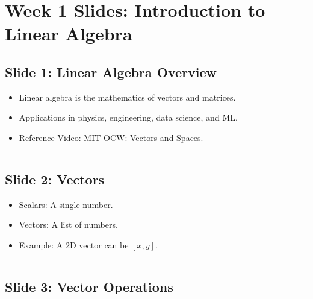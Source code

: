 \documentclass[
]{article}
\author{}
\date{}
\providecommand{\tightlist}{%
  \setlength{\itemsep}{0pt}\setlength{\parskip}{0pt}}
\begin{document}
\hypertarget{week-1-slides-introduction-to-linear-algebra}{%
	\section{Week 1 Slides: Introduction to Linear
	  Algebra}\label{week-1-slides-introduction-to-linear-algebra}}

\hypertarget{slide-1-linear-algebra-overview}{%
	\subsection{Slide 1: Linear Algebra
		Overview}\label{slide-1-linear-algebra-overview}}

\begin{itemize}
	\tightlist
	\item
	      Linear algebra is the mathematics of vectors and matrices.
	\item
	      Applications in physics, engineering, data science, and ML.
	\item
	      Reference Video:
	      \href{https://www.youtube.com/watch?v=ZK3O402wf1c}{MIT OCW: Vectors
		      and Spaces}.
\end{itemize}

\begin{center}\rule{0.5\linewidth}{0.5pt}\end{center}

\hypertarget{slide-2-vectors}{%
	\subsection{Slide 2: Vectors}\label{slide-2-vectors}}

\begin{itemize}
	\tightlist
	\item
	      Scalars: A single number.
	\item
	      Vectors: A list of numbers.
	\item
	      Example: A 2D vector can be \([x, y]\).
\end{itemize}

\begin{center}\rule{0.5\linewidth}{0.5pt}\end{center}

\hypertarget{slide-3-vector-operations}{%
	\subsection{Slide 3: Vector
		Operations}\label{slide-3-vector-operations}}
\end{document}
